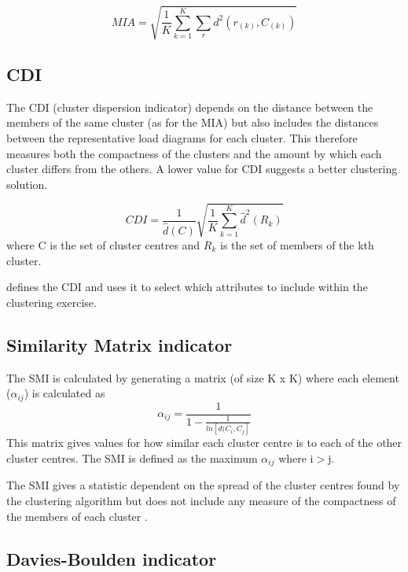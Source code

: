 \documentclass[conference]{IEEEtran}
\begin{document}
\begin{equation}
MIA = \sqrt{ \frac{1}{K} \sum\limits_{k=1}^K \sum\limits_r d^2 (r_{(k)}, C_{(k)})}
\label{equation-eqn2}
\end{equation}

\subsection{CDI}

The CDI (cluster dispersion indicator) depends on the distance between the members of the same cluster (as for the MIA) but also includes the distances between the representative load diagrams for each cluster. This therefore measures both the compactness of the clusters and the amount by which each cluster differs from the others. A lower value for CDI suggests a better clustering solution.

\begin{equation}
CDI = \frac{1}{\hat{d}(C)} \sqrt{ \frac{1}{K} \sum\limits_{k=1}^K \hat{d}^2(R_k)}
\label{equation-eqn3}
\end{equation}
where C is the set of cluster centres and $R_{k}$ is the set of members of the kth cluster.

\cite{chicco2003customer} defines the CDI and uses it to select which attributes to include within the clustering exercise. 

\subsection{Similarity Matrix indicator}

The SMI is calculated by generating a matrix (of size K x K) where each element ($\alpha_{ij}$) is calculated as
\begin{equation}
\alpha_{ij} = \frac{1}{1 - \frac{1}{ln[d(C_{i},C_{j}]}}
\label{equation-eqn4}
\end{equation}
This matrix gives values for how similar each cluster centre is to each of the other cluster centres. 
The SMI is defined as the maximum $\alpha_{ij}$ where i$>$j.

The SMI gives a statistic dependent on the spread of the cluster centres found by the clustering algorithm but does not include any measure of the compactness of the members of each cluster \cite{chicco2003application}.

\subsection{Davies-Boulden indicator}
\end{document}
